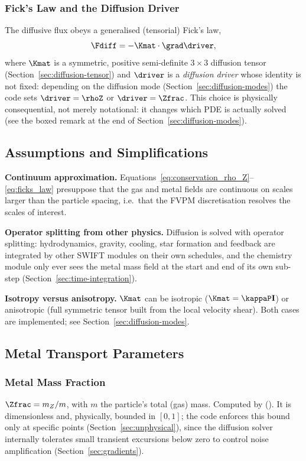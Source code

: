 \subsubsection{Fick's Law and the Diffusion Driver}
\label{sec:ficks-law}
The diffusive flux obeys a generalised (tensorial) Fick's law,
\begin{equation}
  \label{eq:ficks_law}
  \Fdiff = -\Kmat \cdot \grad \driver ,
\end{equation}
where $\Kmat$ is a symmetric, positive semi-definite $3\times3$ diffusion
tensor (Section~\ref{sec:diffusion-tensor}) and $\driver$ is a
\emph{diffusion driver} whose identity is not fixed: depending on the
diffusion mode (Section~\ref{sec:diffusion-modes}) the code sets
$\driver = \rhoZ$ or $\driver = \Zfrac$. This choice is physically
consequential, not merely notational: it changes which PDE is actually
solved (see the boxed remark at the end of
Section~\ref{sec:diffusion-modes}).

\subsection{Assumptions and Simplifications}

\textbf{Continuum approximation.}
Equations~\eqref{eq:conservation_rho_Z}--\eqref{eq:ficks_law} presuppose
that the gas and metal fields are continuous on scales larger than the
particle spacing, i.e.\ that the FVPM discretisation resolves the scales
of interest.

\textbf{Operator splitting from other physics.}
Diffusion is solved with operator splitting: hydrodynamics, gravity,
cooling, star formation and feedback are integrated by other SWIFT
modules on their own schedules, and the chemistry module only ever sees
the metal mass field at the start and end of its own sub-step
(Section~\ref{sec:time-integration}).

\textbf{Isotropy versus anisotropy.}
$\Kmat$ can be isotropic ($\Kmat = \kappaP \mathbf I$) or anisotropic
(full symmetric tensor built from the local velocity shear). Both cases
are implemented; see Section~\ref{sec:diffusion-modes}.

\subsection{Metal Transport Parameters}

\subsubsection{Metal Mass Fraction}
$\Zfrac = m_Z / m$, with $m$ the particle's total (gas) mass. Computed by
 ().
It is dimensionless and, physically, bounded in $[0,1]$; the code enforces
this bound only at specific points (Section~\ref{sec:unphysical}), since
the diffusion solver internally tolerates small transient excursions
below zero to control noise amplification (Section~\ref{sec:gradients}).


